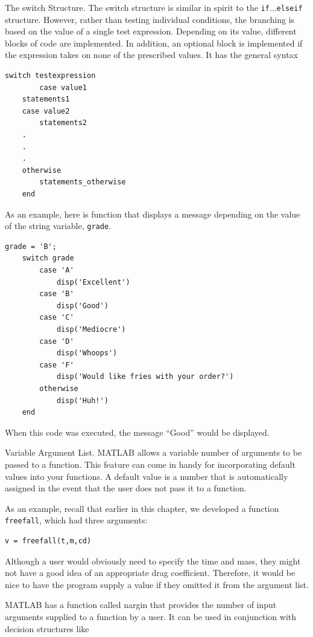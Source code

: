 \documentclass[../main.tex]{subfiles}
\begin{document}
The switch Structure. The switch structure is similar in spirit to the \texttt{if$\ldots$elseif}
structure. However, rather than testing individual conditions, the branching is based on the
value of a single test expression. Depending on its value, different blocks of code are implemented. In addition, an optional block is implemented if the expression takes on none of
the prescribed values. It has the general syntax

\begin{lstlisting}[frame=none, numbers=none]
    switch testexpression
        case value1
    statements1
    case value2
        statements2
    .
    .
    .
    otherwise
        statements_otherwise
    end
\end{lstlisting}
As an example, here is function that displays a message depending on the value of the
string variable, \texttt{grade}.
\begin{lstlisting}[frame=none, numbers=none]
    grade = 'B';
    switch grade
        case 'A'
            disp('Excellent')
        case 'B'
            disp('Good')
        case 'C'
            disp('Mediocre')
        case 'D'
            disp('Whoops')
        case 'F'
            disp('Would like fries with your order?')
        otherwise
            disp('Huh!')
    end
\end{lstlisting}
When this code was executed, the message “Good” would be displayed.


Variable Argument List. MATLAB allows a variable number of arguments to be passed
to a function. This feature can come in handy for incorporating default values into your
functions. A default value is a number that is automatically assigned in the event that the
user does not pass it to a function.


As an example, recall that earlier in this chapter, we developed a function \texttt{freefall},
which had three arguments:
\begin{lstlisting}[frame=none, numbers=none]
    v = freefall(t,m,cd)
\end{lstlisting}
Although a user would obviously need to specify the time and mass, they might not have a
good idea of an appropriate drag coefficient. Therefore, it would be nice to have the 
program supply a value if they omitted it from the argument list.


MATLAB has a function called nargin that provides the number of input arguments
supplied to a function by a user. It can be used in conjunction with decision structures like
\end{document}
